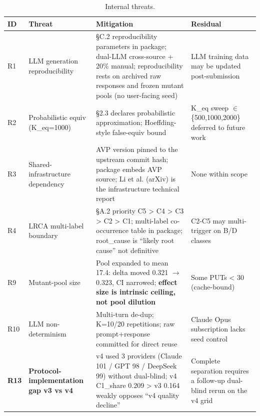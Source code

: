 \documentclass[acmsmall,screen,review]{acmart}
\begin{document}
{\def\LTcaptype{table} %
\begin{longtable}[]{@{}
  >{\raggedright\arraybackslash}p{}
  >{\raggedright\arraybackslash}p{}
  >{\raggedright\arraybackslash}p{}
  >{\raggedright\arraybackslash}p{}@{}}
\caption{Internal threats.}\label{tab:p2-27}\\
\toprule\noalign{}
\begin{minipage}[b]{\linewidth}\raggedright
ID
\end{minipage} & \begin{minipage}[b]{\linewidth}\raggedright
Threat
\end{minipage} & \begin{minipage}[b]{\linewidth}\raggedright
Mitigation
\end{minipage} & \begin{minipage}[b]{\linewidth}\raggedright
Residual
\end{minipage} \\
\midrule\noalign{}
\endfirsthead
\endhead
\bottomrule\noalign{}
\endlastfoot
R1 & LLM generation reproducibility & §C.2 reproducibility parameters in
package; dual-LLM cross-source + 20\% manual; reproducibility rests on
archived raw responses and frozen mutant pools (no user-facing seed) & LLM training data may be updated
post-submission \\
R2 & Probabilistic equiv (K\_eq=1000) & §2.3 declares probabilistic
approximation; Hoeffding-style false-equiv bound & K\_eq sweep $\in$
\{500,1000,2000\} deferred to future work \\
R3 & Shared-infrastructure dependency & AVP version pinned to the upstream commit hash;
package embeds AVP source; Li et al. (arXiv) is the infrastructure technical report &
None within scope \\
R4 & LRCA multi-label boundary & §A.2 priority
C5 \textgreater{} C4 \textgreater{} C3 \textgreater{} C2 \textgreater{} C1;
multi-label co-occurrence table in package; root\_cause is ``likely root
cause'' not definitive & C2-C5 may multi-trigger on B/D classes \\
R9 & Mutant-pool size & Pool expanded to mean 17.4: delta moved 0.321 $\to$
0.323, CI narrowed; \textbf{effect size is intrinsic ceiling, not pool
dilution} & Some PUTs \textless{} 30 (cache-bound) \\
R10 & LLM non-determinism & Multi-turn de-dup; K=10/20 repetitions; raw
prompt+response committed for direct reuse & Claude Opus subscription
lacks seed control \\
\textbf{R13} & \textbf{Protocol-implementation gap v3 vs v4} & v4 used 3
providers (Claude 101 / GPT 98 / DeepSeek 99) without dual-blind; v4
C1\_share 0.209 \textgreater{} v3 0.164 weakly opposes ``v4 quality
decline'' & Complete separation requires a follow-up dual-blind rerun on
the v4 grid \\
\end{longtable}
}
\end{document}
